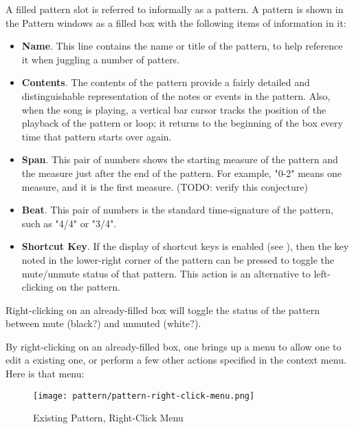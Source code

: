    A filled pattern slot is referred to informally as a pattern.
   A pattern is shown in the Pattern windows as a filled box with the
   following items of information in it:

   \begin{itemize}
      \item \textbf{Name}.
         This line contains the name or title of the pattern, to help
         reference it when juggling a number of patters.
      \item \textbf{Contents}.
         The contents of the pattern provide a fairly detailed and
         distinguishable representation of the notes or events in the
         pattern.  Also, when the song is playing, a vertical bar cursor
         tracks the position of the playback of the pattern or loop; it
         returns to the beginning of the box every time that pattern starts
         over again.
      \item \textbf{Span}.
         This pair of numbers shows the starting measure of the pattern and
         the measure just after the end of the pattern.
         For example, "0-2" means one measure, and it is the first measure.
         (TODO:  verify this conjecture)
      \item \textbf{Beat}.
         This pair of numbers is the standard time-signature of the pattern,
         such as "4/4" or "3/4".
      \item \textbf{Shortcut Key}.
         If the display of shortcut keys is enabled (see
         ),
         then the key noted in the lower-right corner of the pattern can be
         pressed to toggle the mute/unmute status of that pattern.
         This action is an alternative to left-clicking on the pattern.
   \end{itemize}

   Right-clicking on an already-filled box will toggle the status of the
   pattern between mute (black?) and unmuted (white?).

   By right-clicking on an already-filled box, one brings up a menu
   to allow one to edit a existing one, or perform a few other actions
   specified in the context menu.  Here is that menu:

\begin{figure}[H]
   \centering 
   \texttt{[image: pattern/pattern-right-click-menu.png]}
   \caption{Existing Pattern, Right-Click Menu}
   \label{fig:pattern_window_right_click}
\end{figure}

